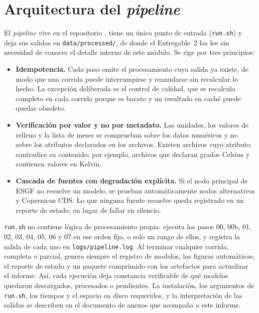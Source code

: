 \section{Arquitectura del \emph{pipeline}}
\label{sec:arquitectura}

El \emph{pipeline} vive en el repositorio , tiene un único punto de entrada (\texttt{run.sh}) y deja sus salidas en \texttt{data/processed/}, de donde el Entregable~2 las lee sin necesidad de conocer el detalle interno de este módulo. Se rige por tres principios:

\begin{itemize}
\item \textbf{Idempotencia.} Cada paso omite el procesamiento cuya salida ya existe, de modo que una corrida puede interrumpirse y reanudarse sin recalcular lo hecho. La excepción deliberada es el control de calidad, que se recalcula completo en cada corrida porque es barato y un resultado en caché puede quedar obsoleto.
\item \textbf{Verificación por valor y no por metadato.} Las unidades, los valores de relleno y la lista de meses se comprueban sobre los datos numéricos y no sobre los atributos declarados en los archivos. Existen archivos cuyo atributo contradice su contenido; por ejemplo, archivos que declaran grados Celsius y contienen valores en Kelvin.
\item \textbf{Cascada de fuentes con degradación explícita.} Si el nodo principal de ESGF no resuelve un modelo, se prueban automáticamente nodos alternativos y Copernicus CDS. Lo que ninguna fuente resuelve queda registrado en un reporte de estado, en lugar de fallar en silencio.
\end{itemize}

\texttt{run.sh} no contiene lógica de procesamiento propia: ejecuta los pasos 00, 00b, 01, 02, 03, 04, 05, 06 y 07 en ese orden fijo, o solo un rango de ellos, y registra la salida de cada uno en \texttt{logs/pipeline.log}. Al terminar cualquier corrida, completa o parcial, genera siempre el registro de modelos, las figuras automáticas, el reporte de estado y un paquete comprimido con los artefactos para actualizar el informe. Así, cada ejecución deja constancia verificable de qué modelos quedaron descargados, procesados o pendientes. La instalación, los argumentos de \texttt{run.sh}, los tiempos y el espacio en disco requeridos, y la interpretación de las salidas se describen en el documento de anexos que acompaña a este informe.
